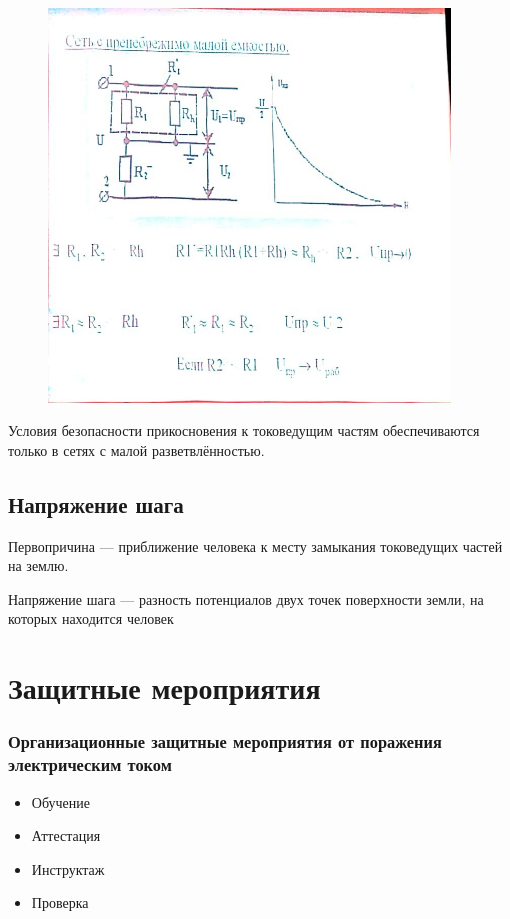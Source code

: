 \documentclass[a4paper, 14pt]{extarticle}
\begin{document}
\begin{figure}[h]
    \centering
    \includegraphics[width=0.95\textwidth]{./img/L3/S002.jpg}
\end{figure}

Условия безопасности прикосновения к токоведущим частям обеспечиваются только в сетях с малой разветвлённостью.

\subsection{Напряжение шага}
Первопричина --- приближение человека к месту замыкания токоведущих частей на землю.

Напряжение шага --- разность потенциалов двух точек поверхности земли, на  которых находится человек

\section{Защитные мероприятия}

\subsubsection*{Организационные защитные мероприятия от поражения электрическим током}

\begin{itemize}
    \item Обучение
    \item Аттестация
    \item Инструктаж
    \item Проверка
\end{itemize}
\end{document}
